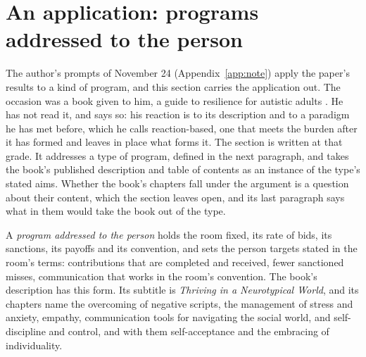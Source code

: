 
\section{An application: programs addressed to the person}\label{sec:programs}

The author's prompts of November 24 (Appendix~\ref{app:note}) apply the paper's results to a kind of program, and this section carries the application out. The occasion was a book given to him, a guide to resilience for autistic adults \cite{GoldsteinBrooks2026}. He has not read it, and says so: his reaction is to its description and to a paradigm he has met before, which he calls reaction-based, one that meets the burden after it has formed and leaves in place what forms it. The section is written at that grade. It addresses a type of program, defined in the next paragraph, and takes the book's published description and table of contents as an instance of the type's stated aims. Whether the book's chapters fall under the argument is a question about their content, which the section leaves open, and its last paragraph says what in them would take the book out of the type.

A \emph{program addressed to the person} holds the room fixed, its rate of bids, its sanctions, its payoffs and its convention, and sets the person targets stated in the room's terms: contributions that are completed and received, fewer sanctioned misses, communication that works in the room's convention. The book's description has this form. Its subtitle is \emph{Thriving in a Neurotypical World}, and its chapters name the overcoming of negative scripts, the management of stress and anxiety, empathy, communication tools for navigating the social world, and self-discipline and control, and with them self-acceptance and the embracing of individuality.

